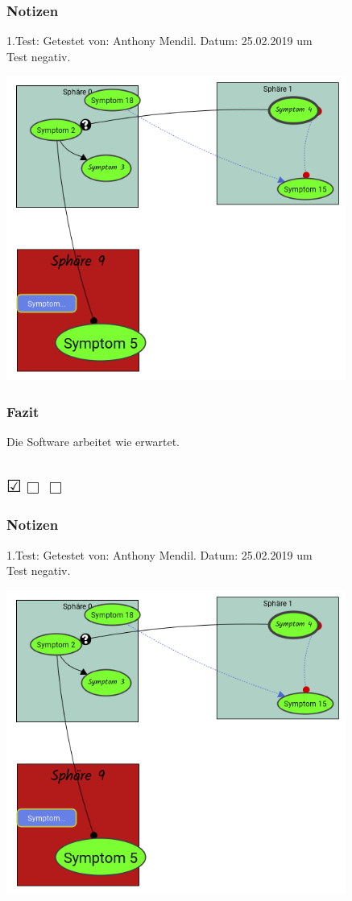 \documentclass{scrartcl}
\newcommand{\subsectiont}[2]{\subsection[#1]{#1{\normalsize\normalfont #2}}}
\newcommand{\leer}{$\Box$}
\newcommand{\ok}{$\CheckedBox$}
\begin{document}
\subsubsection{Notizen}
1.Test: Getestet von: Anthony Mendil. Datum: 25.02.2019 um  \\
Test negativ. 
\begin{center}
\includegraphics[height=10cm]{3_42.PNG}
\end{center}
\subsubsection{Fazit}
Die Software arbeitet wie erwartet.

\subsectiont{}{\dotfill\ok\leer\leer}
\subsubsection{Notizen}
1.Test: Getestet von: Anthony Mendil. Datum: 25.02.2019 um  \\
Test negativ. 
\begin{center}
\includegraphics[height=10cm]{3_42.PNG}
\end{center}
\end{document}
